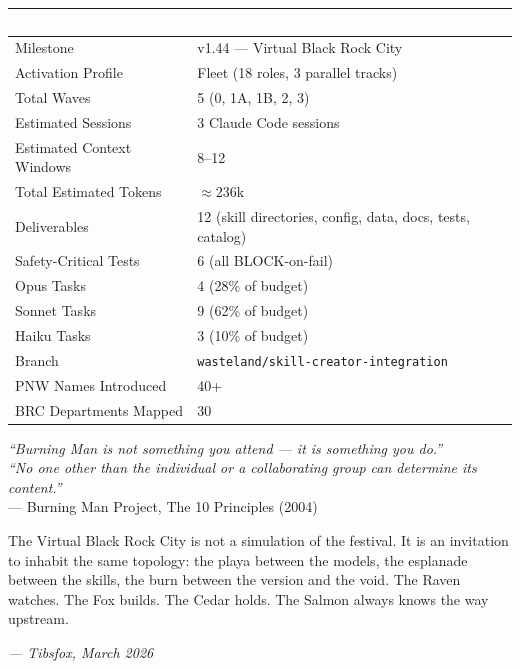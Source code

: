 \documentclass[11pt,letterpaper]{article}
\newcommand{\tableheader}[1]{\textbf{\sffamily\textcolor{white}{#1}}}
\begin{document}
\begin{center}
\begin{tabularx}{\textwidth}{L{5cm}X}
\toprule
{}
\tableheader{Metric} & \tableheader{Value} \\
\midrule
Milestone & v1.44 --- Virtual Black Rock City \\
Activation Profile & Fleet (18 roles, 3 parallel tracks) \\
Total Waves & 5 (0, 1A, 1B, 2, 3) \\
Estimated Sessions & 3 Claude Code sessions \\
Estimated Context Windows & 8--12 \\
Total Estimated Tokens & $\approx$236k \\
Deliverables & 12 (skill directories, config, data, docs, tests, catalog) \\
Safety-Critical Tests & 6 (all BLOCK-on-fail) \\
Opus Tasks & 4 (28\% of budget) \\
Sonnet Tasks & 9 (62\% of budget) \\
Haiku Tasks & 3 (10\% of budget) \\
Branch & \texttt{wasteland/skill-creator-integration} \\
PNW Names Introduced & 40+ \\
BRC Departments Mapped & 30 \\
\bottomrule
\end{tabularx}
\end{center}

\vspace{2em}

\begin{quotebox}
\textit{``Burning Man is not something you attend --- it is something you do.''} \\[0.5em]
\textit{``No one other than the individual or a collaborating group can determine its content.''} \\[0.5em]
--- Burning Man Project, The 10 Principles (2004)

\vspace{0.8em}
The Virtual Black Rock City is not a simulation of the festival. It is an invitation to inhabit the same topology: the playa between the models, the esplanade between the skills, the burn between the version and the void. The Raven watches. The Fox builds. The Cedar holds. The Salmon always knows the way upstream.

\vspace{0.3em}
\textit{--- Tibsfox, March 2026}
\end{quotebox}
\end{document}
